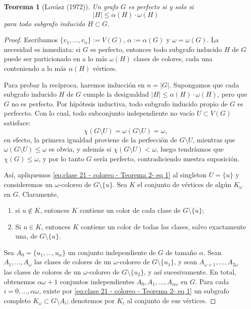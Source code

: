\documentclass[12pt]{report}
\theoremstyle{plain}
\newtheorem{theorem}{Teorema}[section]
\theoremstyle{definition}
\newcommand{\abs}[1]{\left \vert #1 \right \vert}
\begin{document}
\begin{theorem}[Lovász (1972)]
Un grafo $G$ es perfecto si y solo si
\[
    \abs H \leq \alpha (H) \cdot \omega (H)
\]
para todo subgrafo inducido $H \subset G$.
\end{theorem}
\begin{proof}
Escribamos $\{v_1, \ldots,v_n\} := V(G)$, $\alpha := \alpha (G)$ y $\omega = \omega (G)$. La necesidad es inmediata: si $G$ es perfecto, entonces todo subgrafo inducido $H$ de $G$ puede ser particionado en a lo más $\omega (H)$ clases de colores, cada una conteniendo a lo más $\alpha (H)$ vértices.

Para probar la recíproca, haremos inducción en $n = \abs G$. Supongamos que cada subgrafo inducido $H$ de $G$ cumple la desigualdad $\abs H \leq \alpha (H) \cdot \omega (H)$, pero que $G$ no es perfecto. Por hipótesis inductiva, todo subgrafo inducido propio de $G$ es perfeccto. Con lo cual, todo subconjunto independiente no vacío $U \subset V(G)$ satisface:
\begin{equation}\label{eq:clase 21 - coloreo - Teorema 2- eq 1}
\chi (G \setminus U) = \omega (G \setminus U) = \omega,
\end{equation}
en efecto, la primera igualdad proviene de la perfección de $G \setminus U$, mientras que $\omega (G \setminus U) \leq \omega$ es obvia, y además si $\chi (G \setminus U) < \omega$, luego tendríamos que $\chi (G) \leq \omega$, y por lo tanto $G$ sería perfecto, contradiciendo nuestra suposición.

Así, apliquemos \eqref{eq:clase 21 - coloreo - Teorema 2- eq 1} al singleton $U = \{u \}$ y consideremos un $\omega$-coloreo de $G \setminus \{u\}$. Sea $K$ el conjunto de vértices de algún $K_\omega$ en $G$. Claramente,
\begin{enumerate}[(1)]
\item si $u \not \in K$, entonces $K$ contiene un color de cada clase de $G \setminus \{u\}$;
\item Si $u \in K$, entonces $K$ contiene un color de todas las clases, salvo exactamente una, de $G \setminus \{u\}$.
\end{enumerate}

Sea $A_0 = \{u_1, \ldots, u_\alpha\}$ un conjunto independiente de $G$ de tamaño $\alpha$. Sean $A_1, \ldots, A_\omega$ las clases de colores de un $\omega$-coloreo de $G \setminus \{u_1\}$, y sean $A_{\omega + 1}, \ldots, A_{2\omega}$ las clases de colores de un $\omega$-coloreo de $G \setminus \{u_2\}$, y así sucesivamente. En total, obtenemos $\alpha \omega + 1$ conjuntos independientes $A_0, A_1, \ldots, A_{\alpha \omega}$ en $G$. Para cada $i = 0, \ldots, \alpha \omega$, existe por \eqref{eq:clase 21 - coloreo - Teorema 2- eq 1} un subgrafo completo $K_\omega \subset G \setminus A_{i}$; denotemos por $K_i$ al conjunto de sus vértices.


\end{proof}
\end{document}
